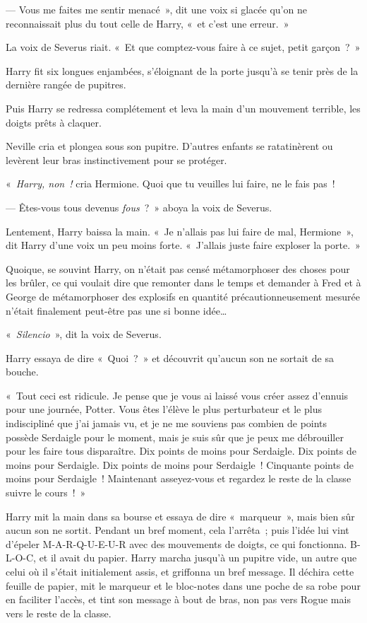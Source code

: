 --- Vous me faites me sentir menacé~», dit une voix si glacée qu'on ne reconnaissait plus du tout celle de Harry, «~et c'est une erreur.~»

La voix de Severus riait.
«~Et que comptez-vous faire à ce sujet, petit garçon~?~»

Harry fit six longues enjambées, s'éloignant de la porte jusqu'à se tenir près de la dernière rangée de pupitres.

Puis Harry se redressa complétement et leva la main d'un mouvement terrible, les doigts prêts à claquer.

Neville cria et plongea sous son pupitre.
D'autres enfants se ratatinèrent ou levèrent leur bras instinctivement pour se protéger.

«~\emph{Harry, non~!} cria Hermione.
Quoi que tu veuilles lui faire, ne le fais pas~!

--- Êtes-vous tous devenus \emph{fous}~?~»
aboya la voix de Severus.

Lentement, Harry baissa la main.
«~Je n'allais pas lui faire de mal, Hermione~», dit Harry d'une voix un peu moins forte.
«~J'allais juste faire exploser la porte.~»

Quoique, se souvint Harry, on n'était pas censé métamorphoser des choses pour les brûler, ce qui voulait dire que remonter dans le temps et demander à Fred et à George de métamorphoser des explosifs en quantité précautionneusement mesurée n'était finalement peut-être pas une si bonne idée…

«~\emph{Silencio}~», dit la voix de Severus.

Harry essaya de dire «~Quoi~?~» et découvrit qu'aucun son ne sortait de sa bouche.

«~Tout ceci est ridicule.
Je pense que je vous ai laissé vous créer assez d'ennuis pour une journée, Potter.
Vous êtes l'élève le plus perturbateur et le plus indiscipliné que j'ai jamais vu, et je ne me souviens pas combien de points possède Serdaigle pour le moment, mais je suis sûr que je peux me débrouiller pour les faire tous disparaître.
Dix points de moins pour Serdaigle.
Dix points de moins pour Serdaigle.
Dix points de moins pour Serdaigle~!
Cinquante points de moins pour Serdaigle~!
Maintenant asseyez-vous et regardez le reste de la classe suivre le cours~!~»

Harry mit la main dans sa bourse et essaya de dire «~marqueur~», mais bien sûr aucun son ne sortit.
Pendant un bref moment, cela l'arrêta~; puis l'idée lui vint d'épeler M-A-R-Q-U-E-U-R avec des mouvements de doigts, ce qui fonctionna.
B-L-O-C, et il avait du papier.
Harry marcha jusqu'à un pupitre vide, un autre que celui où il s'était initialement assis, et griffonna un bref message.
Il déchira cette feuille de papier, mit le marqueur et le bloc-notes dans une poche de sa robe pour en faciliter l'accès, et tint son message à bout de bras, non pas vers Rogue mais vers le reste de la classe.

